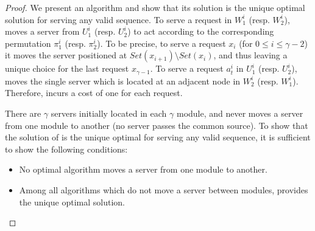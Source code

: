 \begin{proof}
 We present an algorithm \sol and show that its solution is the unique optimal solution for serving any valid sequence. To serve a request in $W_1^i$ (resp. $W_2^i$), \sol moves a server from $U_1^i$ (resp. $U_2^i$) to act according to the corresponding permutation $\pi_1^i$ (resp. $\pi_2^i$). To be precise, to serve a request $x_i$ (for $0 \leq i \leq \gamma-2$) it moves the server positioned at $Set(x_{i+1}) \setminus Set(x_{i})$, and thus leaving a unique choice for the last request $x_{\gamma-1}$. To serve a request $a_t^i$ in $U_1^i$ (resp. $U_2^i$), \sol moves the single server which is located at an adjacent node in $W_2^i$ (resp. $W_1^i$). Therefore, \sol incurs a cost of one for each request. 

There are $\gamma$ servers initially located in each $\gamma$ module, and \sol never moves a server from one module to another (no server passes the common source). To show that the solution of \sol is the unique optimal for serving any valid sequence, it is sufficient to show the following conditions: 

\begin{itemize}
\item No optimal algorithm moves a server from one module to another. 
\item Among all algorithms which do not move a server between modules, \sol provides the unique optimal solution.
\end{itemize}


\end{proof}
